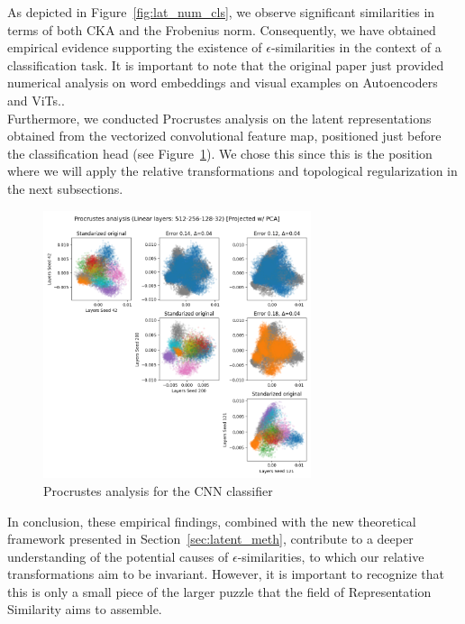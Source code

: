 \documentclass[../main.tex]{subfiles}
\begin{document}
As depicted in Figure~\ref{fig:lat_num_cls}, we observe significant similarities in terms of both CKA and the Frobenius norm. Consequently, we have obtained empirical evidence supporting the existence of $\epsilon$-similarities in the context of a classification task. It is important to note that the original paper just provided numerical analysis on word embeddings and visual examples on Autoencoders and ViTs..\\

Furthermore, we conducted Procrustes analysis on the latent representations obtained from the vectorized convolutional feature map, positioned just before the classification head (see Figure~\ref{fig:proc_cls}). We chose this since this is the position where we will apply the relative transformations and topological regularization in the next subsections. \\


\begin{figure}[ht!]
    \centering
    \includegraphics[width=0.7\textwidth]{figures/rs/sim_cls/procrustes_512-256-128-32__42_200_121.png} 
    \caption{Procrustes analysis for the CNN classifier}
    \label{fig:proc_cls}
\end{figure}

In conclusion, these empirical findings, combined with the new theoretical framework presented in Section~\ref{sec:latent_meth}, contribute to a deeper understanding of the potential causes of $\epsilon$-similarities, to which our relative transformations aim to be invariant. However, it is important to recognize that this is only a small piece of the larger puzzle that the field of Representation Similarity aims to assemble.
\end{document}
